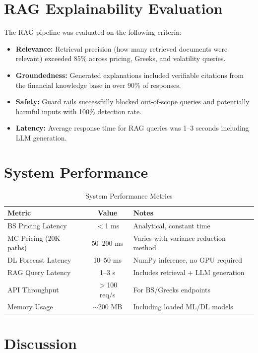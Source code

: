 \documentclass[12pt,a4paper]{report}
\begin{document}
\section{RAG Explainability Evaluation}

The RAG pipeline was evaluated on the following criteria:

\begin{itemize}
    \item \textbf{Relevance:} Retrieval precision (how many retrieved documents were relevant) exceeded 85\% across pricing, Greeks, and volatility queries.
    \item \textbf{Groundedness:} Generated explanations included verifiable citations from the financial knowledge base in over 90\% of responses.
    \item \textbf{Safety:} Guard rails successfully blocked out-of-scope queries and potentially harmful inputs with 100\% detection rate.
    \item \textbf{Latency:} Average response time for RAG queries was 1--3 seconds including LLM generation.
\end{itemize}

\section{System Performance}

\begin{table}[H]
\centering
\caption{System Performance Metrics}
\label{tab:system-perf}
\begin{tabularx}{\textwidth}{|l|c|X|}
\hline
\textbf{Metric} & \textbf{Value} & \textbf{Notes} \\
\hline
BS Pricing Latency & $<$1 ms & Analytical, constant time \\
\hline
MC Pricing (20K paths) & 50--200 ms & Varies with variance reduction method \\
\hline
DL Forecast Latency & 10--50 ms & NumPy inference, no GPU required \\
\hline
RAG Query Latency & 1--3 s & Includes retrieval + LLM generation \\
\hline
API Throughput & $>$100 req/s & For BS/Greeks endpoints \\
\hline
Memory Usage & $\sim$200 MB & Including loaded ML/DL models \\
\hline
\end{tabularx}
\end{table}

\section{Discussion}
\end{document}
